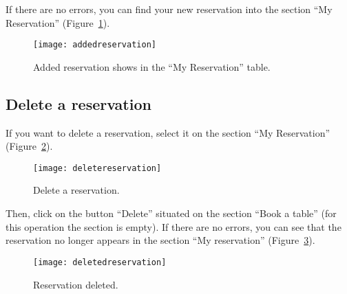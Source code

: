 If there are no errors, you can find your new reservation into the section ``My
Reservation'' (Figure~\ref{fig:addedreservation}).

\begin{figure}[!hb]
	\texttt{[image: addedreservation]}
	\caption{Added reservation shows in the ``My Reservation'' table.}
	\label{fig:addedreservation}
\end{figure}

\subsection{Delete a reservation}

If you want to delete a reservation, select it on the section ``My
Reservation'' (Figure~\ref{fig:deletereservation}).

\begin{figure}[ht]
	\texttt{[image: deletereservation]}
	\caption{Delete a reservation.}
	\label{fig:deletereservation}
\end{figure}

Then, click on the button ``Delete'' situated on the section ``Book a table'' (for
this operation the section is empty). If there are no errors, you can see that
the reservation no longer appears in the section ``My reservation''
(Figure~\ref{fig:deletedreservation}).

\begin{figure}[!ht]
	\texttt{[image: deletedreservation]}
	\caption{Reservation deleted.}
	\label{fig:deletedreservation}
\end{figure}
